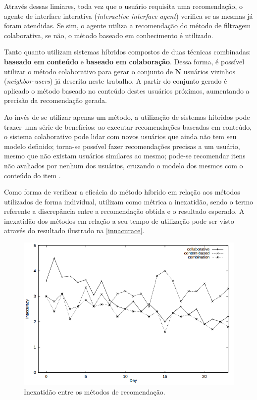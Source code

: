 \documentclass[12pt, openright, oneside, a4paper, brazil]{abntex2}
\begin{document}
Através dessas limiares, toda vez que o usuário requisita uma recomendação, o agente de interface interativa (\textit{interactive interface agent}) verifica se as mesmas já foram atendidas. Se sim, o agente utiliza a recomendação do método de filtragem colaborativa, se não, o método baseado em conhecimento é utilizado.

Tanto  quanto  utilizam sistemas híbridos compostos de duas técnicas combinadas: \textbf{baseado em conteúdo} e \textbf{baseado em colaboração}. Dessa forma, é possível utilizar o método colaborativo para gerar o conjunto de $\textbf{N}$ usuários vizinhos (\textit{neighbor-users}) já descrita neste trabalho. A partir do conjunto gerado é aplicado o método baseado no conteúdo destes usuários próximos, aumentando a precisão da recomendação gerada.

Ao invés de se utilizar apenas um método, a utilização de sistemas híbridos pode trazer uma série de benefícios: ao executar recomendações baseadas em conteúdo, o sistema colaborativo pode lidar com novos usuários que ainda não tem seu modelo definido; torna-se possível fazer recomendações precisas a um usuário, mesmo que não existam usuários similares ao mesmo; pode-se recomendar itens não avaliados por nenhum dos usuários, cruzando o modelo dos mesmos com o conteúdo do item \cite{balabanovic1997fab}.

Como forma de verificar a eficácia do método híbrido em relação aos métodos utilizados de forma individual,  utilizam como métrica a inexatidão, sendo o termo referente a discrepância entre a recomendação obtida e o resultado esperado. A inexatidão dos métodos em relação a seu tempo de utilização pode ser visto através do resultado ilustrado na \autoref{innacurace}.

\begin{figure}[h!tp]
	\caption{\label{innacurace}Inexatidão entre os métodos de recomendação.}
	\begin{center}
		\includegraphics[scale=0.8]{images/innacurace.png}
	\end{center}
\end{figure}
\end{document}
